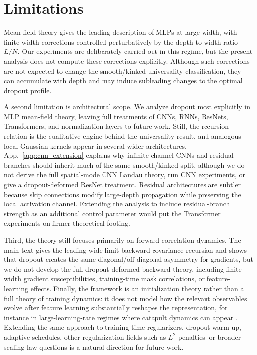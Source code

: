 \documentclass{article}
\theoremstyle{plain}
\theoremstyle{definition}
\theoremstyle{remark}
\begin{document}
\section{Limitations}
Mean-field theory gives the leading description of MLPs at large width, with finite-width corrections controlled perturbatively by the depth-to-width ratio \(L/N\). Our experiments are deliberately carried out in this regime, but the present analysis does not compute these corrections explicitly. Although such corrections are not expected to change the smooth/kinked universality classification, they can accumulate with depth and may induce subleading changes to the optimal dropout profile.

A second limitation is architectural scope. We analyze dropout most explicitly in MLP mean-field theory, leaving full treatments of CNNs, RNNs, ResNets, Transformers, and normalization layers to future work. Still, the recursion relation is the qualitative engine behind the universality result, and analogous local Gaussian kernels appear in several wider architectures. App.~\ref{app:cnn_extension} explains why infinite-channel CNNs and residual branches should inherit much of the same smooth/kinked split, although we do not derive the full spatial-mode CNN Landau theory, run CNN experiments, or give a dropout-deformed ResNet treatment. Residual architectures are subtler because skip connections modify large-depth propagation while preserving the local activation channel. Extending the analysis to include residual-branch strength as an additional control parameter would put the Transformer experiments on firmer theoretical footing.

Third, the theory still focuses primarily on forward correlation dynamics. The main text gives the leading wide-limit backward covariance recursion and shows that dropout creates the same diagonal/off-diagonal asymmetry for gradients, but we do not develop the full dropout-deformed backward theory, including finite-width gradient susceptibilities, training-time mask correlations, or feature-learning effects. Finally, the framework is an initialization theory rather than a full theory of training dynamics: it does not model how the relevant observables evolve after feature learning substantially reshapes the representation, for instance in large-learning-rate regimes where catapult dynamics can appear \cite{zhu2024quadraticcatapult}. Extending the same approach to training-time regularizers, dropout warm-up, adaptive schedules, other regularization fields such as \(L^2\) penalties, or broader scaling-law questions \cite{Bahri2024ExplainingScalingLaws} is a natural direction for future work.
\end{document}
